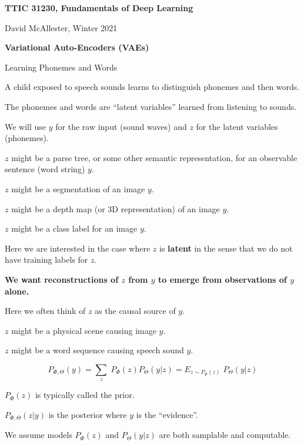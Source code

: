 




{\Huge

  \centerline{\bf TTIC 31230, Fundamentals of Deep Learning}
  \bigskip
  \centerline{David McAllester, Winter 2021}
  \vfill
  \vfill
  \centerline{\bf Variational Auto-Encoders (VAEs)}
  \vfill
  \vfill

{Learning Phonemes and Words}

A child exposed to speech sounds learns to distinguish phonemes and then words.

\vfill
The phonemes and words are ``latent variables'' learned from listening to sounds.

\vfill
We will use $y$ for the raw input (sound waves) and $z$ for the latent variables (phonemes).


$z$ might be a parse tree, or some other semantic representation, for an observable sentence (word string) $y$.

\vfill
$z$ might be a segmentation of an image $y$.

\vfill
$z$ might be a depth map (or 3D representation) of an image $y$.

\vfill
$z$ might be a class label for an image $y$.

\vfill
Here we are interested in the case where $z$ is {\bf latent} in the sense that we do not have training labels for $z$.

\vfill
{\bf We want reconstructions of $z$ from $y$ to emerge from observations of $y$ alone.}


Here we often think of $z$ as the causal source of $y$.

\vfill
$z$ might be a physical scene causing image $y$.

\vfill
$z$ might be a word sequence causing speech sound $y$.


{\color{red} $$P_{\Phi,\Theta}(y) = \sum_z\;P_\Phi(z)P_\Theta(y|z) = E_{z \sim P_\Phi(z)}\;P_\Theta(y|z)$$}

\vfill
$P_\Phi(z)$ is typically called the prior.

\vfill
$P_{\Phi,\Theta}(z|y)$ is the posterior where $y$ is the ``evidence''.



We assume models $P_\Phi(z)$ and $P_\Theta(y|z)$ are both samplable and computable.

}
